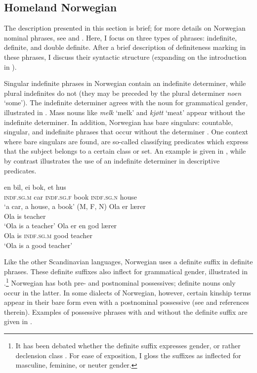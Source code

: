 \documentclass[output=paper]{langscibook}
\begin{document}
\subsection{Homeland Norwegian} \label{Sect-Homeland}
The description presented in this section is brief; for more details on Norwegian nominal phrases, see \citet{FaarlundEtAl1997} and \citet{Julien2002Determiners,Julien2005}. Here, I focus on three types of phrases: indefinite, definite, and double definite. After a brief description of definiteness marking in these phrases, I discuss their syntactic structure (expanding on the introduction in ).

Singular indefinite phrases in Norwegian contain an indefinite determiner, while plural indefinites do not (they may be preceded by the plural determiner \textit{noen} `some'). The indefinite determiner agrees with the noun for grammatical gender, illustrated in . Mass nouns like \textit{melk} `melk' and \textit{kjøtt} `meat' appear without the indefinite determiner. In addition, Norwegian has bare singulars: countable, singular, and indefinite phrases that occur without the determiner \citep[see][]{Borthen2003}. One context where bare singulars are found, are so-called classifying predicates which express that the subject belongs to a certain class or set. An example is given in , while  by contrast illustrates the use of an indefinite determiner in descriptive predicates.
 

\ea \label{ex:vanbaal:2}
\gll en bil, ei bok, et hus \\
    \textsc{indf.sg.m} car \textsc{indf.sg.f} book \textsc{indf.sg.n} house \\
\glt `a car, a house, a book' (M, F, N)
\ex \label{ex:vanbaal:3}
\ea \label{ex:vanbaal:3a}
\gll Ola er lærer \\
    Ola is teacher \\
\glt `Ola is a teacher'
\ex \label{ex:vanbaal:3b}
\gll Ola er en god lærer \\
    Ola is \textsc{indf.sg.m} good teacher \\
\glt `Ola is a good teacher' \\ 
\citep[6]{Kinn2020}
\z
\z

Like the other Scandinavian languages, Norwegian uses a definite suffix in definite phrases. These definite suffixes also inflect for grammatical gender, illustrated in .\footnote{It has been debated whether the definite suffix expresses gender, or rather declension class \citep[see the overview in][]{LohndalWestergaard2021}. For ease of exposition, I gloss the suffixes as inflected for masculine, feminine, or neuter gender.} Norwegian has both pre- and postnominal possessives; definite nouns only occur in the latter. In some dialects of Norwegian, however, certain kinship terms appear in their bare form even with a postnominal possessive (see \citealt{Kinn2021} and references therein). Examples of possessive phrases with and without the definite suffix are given in .
 
\end{document}
